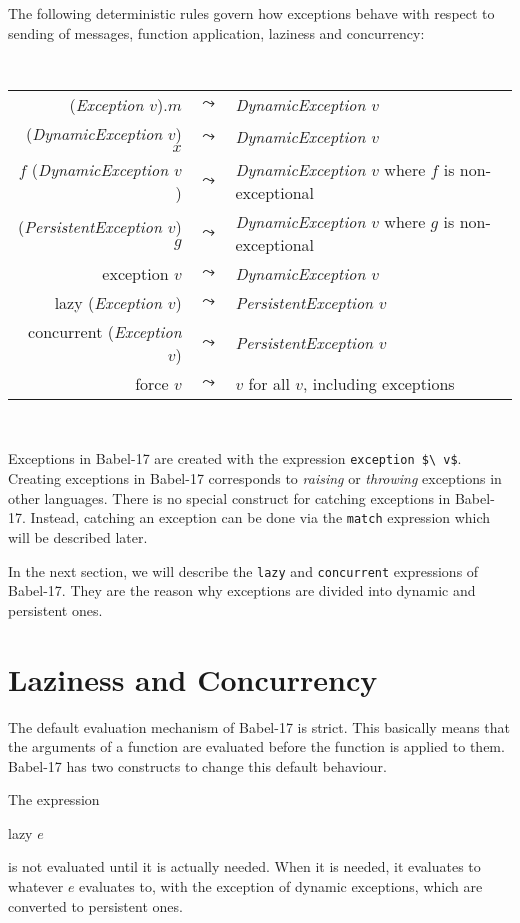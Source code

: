 \documentclass[11pt]{amsart}
\newcommand{\metababel}[1] {\textsl{#1}}
\newenvironment{babelcode}[0]{\begin{center}\tt}{\end{center}}
\newcommand{\babelsrc}[1] {\lstinline!#1!}
\begin{document}
The following deterministic rules govern how exceptions behave with respect to sending of messages, function application, laziness and concurrency:
\begin{babelcode}
\begin{tabular}{rcl}
(\metababel{Exception $v$}).$m$ & $\leadsto$ & \metababel{DynamicException $v$}\\
(\textsl{DynamicException} $v$) $x$ & $\leadsto$ & \metababel{DynamicException $v$}\\
$f$ (\metababel{DynamicException $v$}) & $\leadsto$ & \metababel{DynamicException $v$}  {\rm where $f$ is non-exceptional}\\
(\metababel{PersistentException $v$}) $g$ & $\leadsto$ & \metababel{DynamicException $v$}  {\rm where $g$ is non-exceptional}\\
exception $v$ & $\leadsto$ & \metababel{DynamicException $v$}\\
lazy (\metababel{Exception $v$}) & $\leadsto$ & \metababel{PersistentException $v$}\\
concurrent (\metababel{Exception $v$}) & $\leadsto$ & \metababel{PersistentException $v$}\\
force $v$  & $\leadsto$ & $v$  {\rm for all $v$, including exceptions}
\end{tabular}\\
\end{babelcode}
Exceptions in Babel-17 are created with the expression \babelsrc{exception $\ v$}. Creating exceptions in Babel-17 corresponds to \emph{raising} or \emph{throwing} exceptions in other languages. There is no special construct for catching exceptions in Babel-17. Instead, catching an exception can be done via the \babelsrc{match} expression which will be described later. 

In the next section, we will describe the  \babelsrc{lazy} and \babelsrc{concurrent} expressions of Babel-17. They are the reason why exceptions are divided into dynamic and persistent ones. 

\section{Laziness and Concurrency}
The default evaluation mechanism of Babel-17 is strict. This basically means that the arguments of a function are evaluated before the function is applied to them. Babel-17 has two constructs to change this default behaviour. 

The expression
\begin{babellisting}
lazy $e$
\end{babellisting}
is not evaluated until it is actually needed. When it is needed, it evaluates to whatever $e$ evaluates to, with the exception of dynamic exceptions, which are converted to persistent ones.  
\end{document}
